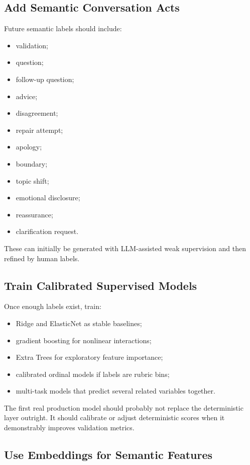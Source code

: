 \documentclass[11pt]{article}
\begin{document}
\subsection{Add Semantic Conversation Acts}

Future semantic labels should include:

\begin{itemize}[leftmargin=*]
  \item validation;
  \item question;
  \item follow-up question;
  \item advice;
  \item disagreement;
  \item repair attempt;
  \item apology;
  \item boundary;
  \item topic shift;
  \item emotional disclosure;
  \item reassurance;
  \item clarification request.
\end{itemize}

These can initially be generated with LLM-assisted weak supervision and then refined by human labels.

\subsection{Train Calibrated Supervised Models}

Once enough labels exist, train:

\begin{itemize}[leftmargin=*]
  \item Ridge and ElasticNet as stable baselines;
  \item gradient boosting for nonlinear interactions;
  \item Extra Trees for exploratory feature importance;
  \item calibrated ordinal models if labels are rubric bins;
  \item multi-task models that predict several related variables together.
\end{itemize}

The first real production model should probably not replace the deterministic layer outright. It should calibrate or adjust deterministic scores when it demonstrably improves validation metrics.

\subsection{Use Embeddings for Semantic Features}
\end{document}
